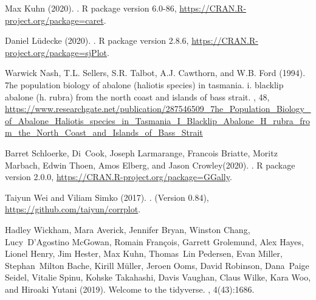 \begin{thebibliography}{3}
Max Kuhn (2020).
.
\newblock R package version 6.0-86, \urlprefix \url{https://CRAN.R-project.org/package=caret}.

Daniel Lüdecke (2020).
.
\newblock R package version 2.8.6, \urlprefix \url{https://CRAN.R-project.org/package=sjPlot}.

Warwick Nash, T.L. Sellers, S.R. Talbot, A.J. Cawthorn, and W.B. Ford (1994).
\newblock 7he population biology of abalone (haliotis species) in tasmania.
  i. blacklip abalone (h. rubra) from the north coast and islands of bass
  strait.
, 48, \urlprefix \url{https://www.researchgate.net/publication/287546509_7he_Population_Biology_of_Abalone_Haliotis_species_in_Tasmania_I_Blacklip_Abalone_H_rubra_from_the_North_Coast_and_Islands_of_Bass_Strait}

Barret Schloerke, Di~Cook, Joseph Larmarange, Francois Briatte, Moritz Marbach,
  Edwin Thoen, Amos Elberg, and Jason Crowley(2020).
.
\newblock R package version 2.0.0, \urlprefix \url{https://CRAN.R-project.org/package=GGally}.

Taiyun Wei and Viliam Simko (2017).
.
\newblock (Version 0.84), \urlprefix \url{https://github.com/taiyun/corrplot}.

Hadley Wickham, Mara Averick, Jennifer Bryan, Winston Chang, Lucy~D'Agostino
  McGowan, Romain François, Garrett Grolemund, Alex Hayes, Lionel Henry, Jim
  Hester, Max Kuhn, Thomas~Lin Pedersen, Evan Miller, Stephan~Milton Bache,
  Kirill Müller, Jeroen Ooms, David Robinson, Dana~Paige Seidel, Vitalie
  Spinu, Kohske Takahashi, Davis Vaughan, Claus Wilke, Kara Woo, and Hiroaki
  Yutani (2019).
\newblock Welcome to the {tidyverse}.
, 4(43):1686.

\end{thebibliography}
